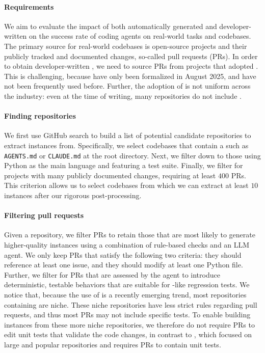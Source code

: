 \paragraph{Requirements}
We aim to evaluate the impact of both automatically generated \agentsmds{} and developer-written \agentsmds{} on the success rate of coding agents on real-world tasks and codebases. 
The primary source for real-world codebases is open-source projects and their publicly tracked and documented changes, so-called pull requests (PRs). 
In order to obtain developer-written \agentsmds, we need to source PRs from projects that adopted \agentsmds{}. 
This is challenging, because \agentsmds{} have only been formalized in August 2025, and have not been frequently used before. 
Further, the adoption of \agentsmd{} is not uniform across the industry: even at the time of writing, many repositories do not include \agentsmds{}.

\paragraph{Finding repositories}
We first use GitHub search to build a list of potential candidate repositories to extract instances from.
Specifically, we select codebases that contain a \agentsmd{} such as \texttt{AGENTS.md} or \texttt{CLAUDE.md} at the root directory. Next, we filter down to those using Python as the main language and featuring a test suite. Finally, we filter for projects with many publicly documented changes, requiring at least $400$ PRs.
This criterion allows us to select codebases from which we can extract at least $10$ instances after our rigorous post-processing.

\paragraph{Filtering pull requests}
Given a repository, we filter PRs to retain those that are most likely to generate higher-quality instances using a combination of rule-based checks and an LLM agent.
We only keep PRs that satisfy the following two criteria: they should reference at least one issue, and they should modify at least one Python file.
Further, we filter for PRs that are assessed by the agent to introduce deterministic, testable behaviors that are suitable for \swebench-like regression tests.
We notice that, because the use of \agentsmds{} is a recently emerging trend, most repositories containing \agentsmds{} are niche.
These niche repositories have less strict rules regarding pull requests, and thus most PRs may not include specific tests.
To enable building instances from these more niche repositories, we therefore do not require PRs to edit unit tests that validate the code changes, in contrast to \swebench{}, which focused on large and popular repositories and requires PRs to contain unit tests.

